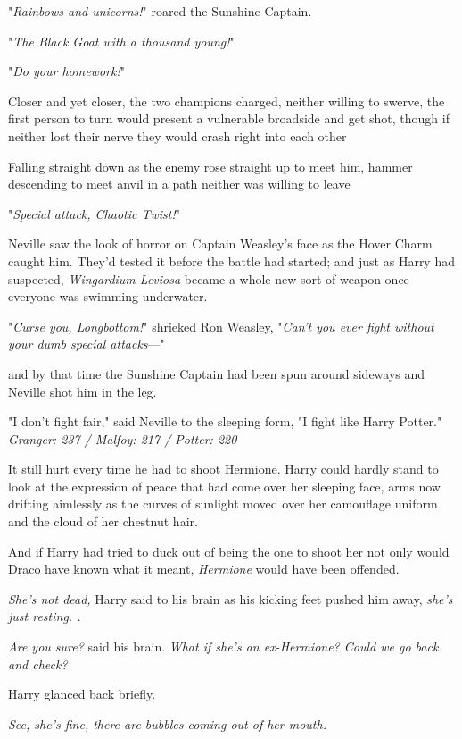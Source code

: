 "\emph{Rainbows and unicorns!}" roared the Sunshine Captain.

"\emph{The Black Goat with a thousand young!}"

"\emph{Do your homework!}"

Closer and yet closer, the two champions charged, neither willing to swerve,
the first person to turn would present a vulnerable broadside and get shot,
though if neither lost their nerve they would crash right into each
other{\el}

Falling straight down as the enemy rose straight up to meet him, hammer
descending to meet anvil in a path neither was willing to leave{\el}

"\emph{Special attack, Chaotic Twist!}"

Neville saw the look of horror on Captain Weasley's face as the Hover Charm
caught him. They'd tested it before the battle had started; and just as Harry
had suspected, \emph{Wingardium Leviosa} became a whole new sort of weapon once
everyone was swimming underwater.

"\emph{Curse you, Longbottom!}" shrieked Ron Weasley, "\emph{Can't you ever
fight without your dumb special attacks}\mbox{---}"

and by that time the Sunshine Captain had been spun around sideways and Neville
shot him in the leg.

"I don't fight fair," said Neville to the sleeping form, "I fight like Harry
Potter."
\sbreak
\emph{Granger: 237 / Malfoy: 217 / Potter: 220}

It still hurt every time he had to shoot Hermione. Harry could hardly stand to
look at the expression of peace that had come over her sleeping face, arms now
drifting aimlessly as the curves of sunlight moved over her camouflage uniform
and the cloud of her chestnut hair.

And if Harry had tried to duck out of being the one to shoot her{\el} not
only would Draco have known what it meant, \emph{Hermione} would have been
offended.

\emph{She's not dead,} Harry said to his brain as his kicking feet pushed him
away, \emph{she's just resting. .}

\emph{Are you sure?} said his brain. \emph{What if she's an ex-Hermione? Could
we go back and check?}

Harry glanced back briefly.

\emph{See, she's fine, there are bubbles coming out of her mouth.}

